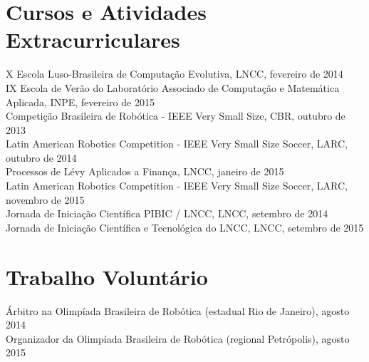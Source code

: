 \documentclass[margin, 10pt]{res} %
\begin{document}
\begin{resume}
\section{Cursos e Atividades Extracurriculares} 
X Escola Luso-Brasileira de Computação Evolutiva, LNCC, fevereiro de 2014\\
IX Escola de Verão do Laboratório Associado de Computação e Matemática Aplicada, INPE, fevereiro de 2015\\
Competição Brasileira de Robótica - IEEE Very Small Size, CBR, outubro de 2013\\
Latin American Robotics Competition - IEEE Very Small Size Soccer, LARC, outubro de 2014\\
Processos de Lévy Aplicados a Finança, LNCC, janeiro de 2015\\
Latin American Robotics Competition - IEEE Very Small Size Soccer, LARC, novembro de 2015\\
Jornada de Iniciação Científica PIBIC / LNCC, LNCC, setembro de 2014\\
Jornada de Iniciação Científica e Tecnológica do LNCC, LNCC, setembro de 2015 


\section{Trabalho Voluntário}
Árbitro na Olimpíada Brasileira de Robótica (estadual Rio de Janeiro), agosto 2014\\
Organizador da Olimpíada Brasileira de Robótica (regional Petrópolis), agosto 2015


\end{resume}
\end{document}
